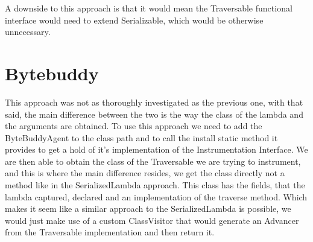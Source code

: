 A downside to this approach is that it would mean the Traversable functional interface would need to extend Serializable, which would be otherwise unnecessary.


\section{Bytebuddy}

This approach was not as thoroughly investigated as the previous one, with that said, the main difference between the two is the way the class of the lambda and the arguments are obtained. To use this approach we need to add the ByteBuddyAgent to the class path and to call the install static method it provides to get a hold of it's implementation of the Instrumentation Interface. We are then able to obtain the class of the Traversable we are trying to instrument, and this is where the main difference resides, we get the class directly not a method like in the SerializedLambda approach. This class has the fields, that the lambda captured, declared and an implementation of the traverse method. Which makes it seem like a similar approach to the SerializedLambda is possible, we would just make use of a custom ClassVisitor that would generate an Advancer from the Traversable implementation and then return it.
